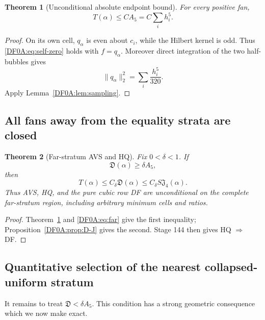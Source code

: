 \documentclass[11pt]{amsart}
\numberwithin{equation}{section}
\newtheorem{theorem}{Theorem}[section]
\theoremstyle{definition}
\theoremstyle{remark}
\newcommand{\Jfour}{\mathfrak J_4}
\begin{document}
\begin{theorem}[Unconditional absolute endpoint bound]
\label{DF0A:thm:absolute}
For every positive fan,
\begin{equation}\label{DF0A:eq:absolute}
 \boxed{T(\alpha)\le C A_5=C\sum_i h_i^5.}
\end{equation}
\end{theorem}

\begin{proof}
On its own cell, $q_\alpha$ is even about $c_i$, while the Hilbert kernel
is odd.  Thus \eqref{DF0A:eq:self-zero} holds with $f=q_\alpha$.  Moreover
direct integration of the two half-bubbles gives
\[
 \|q_\alpha\|_2^2=\sum_i\frac{h_i^5}{320}.
\]
Apply Lemma~\ref{DF0A:lem:sampling}.
\end{proof}

\subsection{All fans away from the equality strata are closed}

\begin{theorem}[Far-stratum AVS and HQ]
\label{DF0A:thm:far}
Fix $0<\delta<1$.  If
\begin{equation}\label{DF0A:eq:far}
 \mathfrak D(\alpha)\ge\delta A_5,
\end{equation}
then
\begin{equation}\label{DF0A:eq:far-conclusion}
 T(\alpha)\le C_\delta\mathfrak D(\alpha)
 \le C_\delta S\Jfour(\alpha).
\end{equation}
Thus AVS, HQ, and the pure cubic row DF are unconditional on the complete
far-stratum region, including arbitrary minimum cells and ratios.
\end{theorem}

\begin{proof}
Theorem~\ref{DF0A:thm:absolute} and \eqref{DF0A:eq:far} give the first inequality;
Proposition~\ref{DF0A:prop:D-J} gives the second.  Stage 144 then gives
HQ $\Rightarrow$ DF.
\end{proof}

\subsection{Quantitative selection of the nearest collapsed-uniform stratum}

It remains to treat $\mathfrak D<\delta A_5$.  This condition has a
strong geometric consequence which we now make exact.
\end{document}
